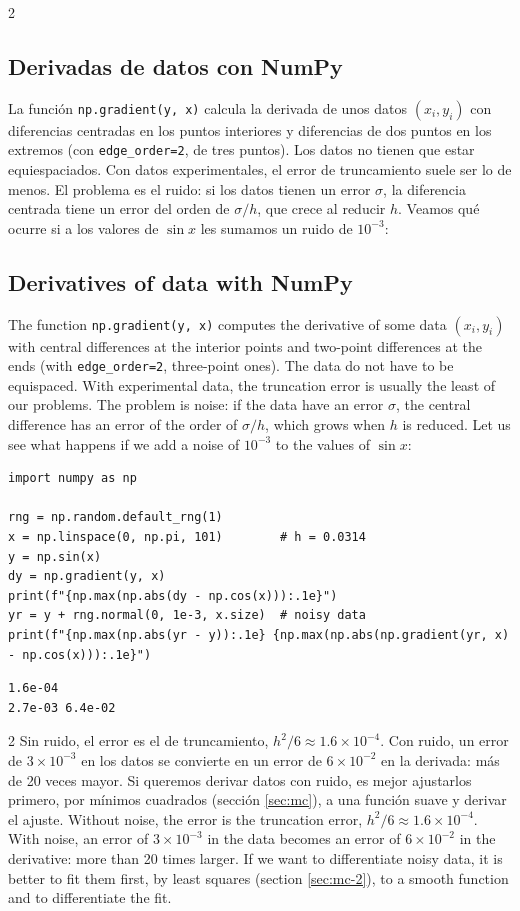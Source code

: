\begin{paracol}{2}
\subsection{Derivadas de datos con NumPy}
La función \texttt{np.gradient(y, x)} calcula la derivada de unos datos $(x_i,y_i)$ con diferencias centradas en los puntos interiores y diferencias de dos puntos en los extremos (con \texttt{edge_order=2}, de tres puntos). Los datos no tienen que estar equiespaciados. Con datos experimentales, el error de truncamiento suele ser lo de menos. El problema es el ruido: si los datos tienen un error $\sigma$, la diferencia centrada tiene un error del orden de $\sigma/h$, que crece al reducir $h$. Veamos qué ocurre si a los valores de $\sin x$ les sumamos un ruido de $10^{-3}$:
\switchcolumn
\subsection{Derivatives of data with NumPy}
The function \texttt{np.gradient(y, x)} computes the derivative of some data $(x_i,y_i)$ with central differences at the interior points and two-point differences at the ends (with \texttt{edge_order=2}, three-point ones). The data do not have to be equispaced. With experimental data, the truncation error is usually the least of our problems. The problem is noise: if the data have an error $\sigma$, the central difference has an error of the order of $\sigma/h$, which grows when $h$ is reduced. Let us see what happens if we add a noise of $10^{-3}$ to the values of $\sin x$:
\end{paracol}
\begin{verbatim}
import numpy as np

rng = np.random.default_rng(1)
x = np.linspace(0, np.pi, 101)        # h = 0.0314
y = np.sin(x)
dy = np.gradient(y, x)
print(f"{np.max(np.abs(dy - np.cos(x))):.1e}")
yr = y + rng.normal(0, 1e-3, x.size)  # noisy data
print(f"{np.max(np.abs(yr - y)):.1e} {np.max(np.abs(np.gradient(yr, x) - np.cos(x))):.1e}")
\end{verbatim}
\begin{verbatim}
1.6e-04
2.7e-03 6.4e-02
\end{verbatim}
\begin{paracol}{2}
Sin ruido, el error es el de truncamiento, $h^2/6\approx 1.6\times10^{-4}$. Con ruido, un error de $3\times10^{-3}$ en los datos se convierte en un error de $6\times10^{-2}$ en la derivada: más de 20 veces mayor. Si queremos derivar datos con ruido, es mejor ajustarlos primero, por mínimos cuadrados (sección \ref{sec:mc}), a una función suave y derivar el ajuste.
\switchcolumn
Without noise, the error is the truncation error, $h^2/6\approx 1.6\times10^{-4}$. With noise, an error of $3\times10^{-3}$ in the data becomes an error of $6\times10^{-2}$ in the derivative: more than 20 times larger. If we want to differentiate noisy data, it is better to fit them first, by least squares (section \ref{sec:mc-2}), to a smooth function and to differentiate the fit.
\end{paracol}

